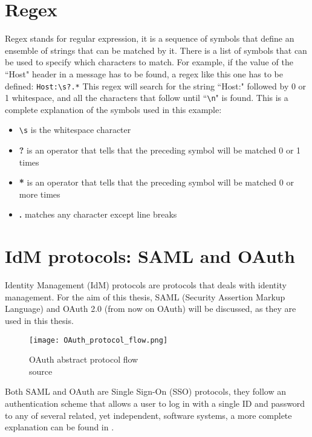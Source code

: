 \section{Regex}
Regex stands for regular expression, it is a sequence of symbols that define an ensemble of strings that can be matched by it. There is a list of symbols that can be used to specify which characters to match. For example, if the value of the ``Host" header in a message has to be found, a regex like this one has to be defined: \verb|Host:\s?.*|
This regex will search for the string ``Host:" followed by 0 or 1 whitespace, and all the characters that follow until ``\verb|\n|" is found. This is a complete explanation of the symbols used in this example:
\begin{itemize}
    \item \verb|\s| is the whitespace character
    \item \textbf{?} is an operator that tells that the preceding symbol will be matched 0 or 1 times
    \item \textbf{*} is an operator that tells that the preceding symbol will be matched 0 or more times
    \item \textbf{.} matches any character except line breaks
\end{itemize}

\section{IdM protocols: SAML and OAuth}
Identity Management (IdM) protocols are protocols that deals with identity management. For the aim of this thesis, \gls{SAML} (Security Assertion Markup Language) and \gls{OAuth} 2.0 (from now on \gls{OAuth}) will be discussed, as they are used in this thesis.
\begin{wrapfigure}{r}{0.5\textwidth}
    \texttt{[image: OAuth\_protocol\_flow.png]}
    \caption{OAuth abstract protocol flow\\source \cite{ietf_oauth2}}
    \label{fig:OAuth_protocol_flow}
\end{wrapfigure}
Both \Gls{SAML} and \gls{OAuth} are Single Sign-On (SSO) protocols, they follow an authentication scheme that allows a user to log in with a single ID and password to any of several related, yet independent, software systems, a more complete explanation can be found in \cite{claudio_grisenti}. 

